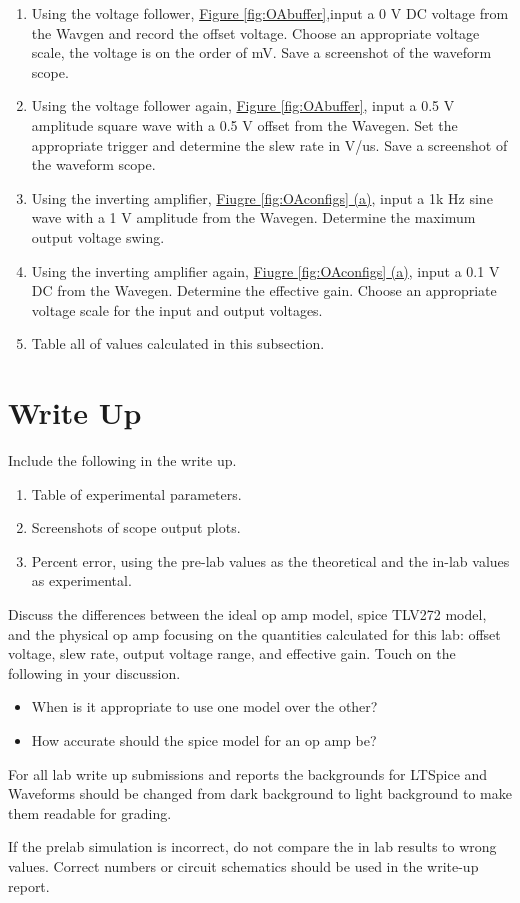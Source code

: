 \begin{enumerate}
	\item Using the voltage follower, \hyperref[fig:OAbuffer]{Figure \ref*{fig:OAbuffer}},input a 0 V DC voltage from the Wavgen and record the offset voltage. Choose an appropriate voltage scale, the voltage is on the order of mV. Save a screenshot of the waveform scope.
	\item Using the voltage follower again, \hyperref[fig:OAbuffer]{Figure \ref*{fig:OAbuffer}}, input a 0.5 V amplitude square wave with a 0.5 V offset from the Wavegen. Set the appropriate trigger and determine the slew rate in V/us. Save a screenshot of the waveform scope.
	\item Using the inverting amplifier, \hyperref[fig:OAconfigs]{Fiugre \ref*{fig:OAconfigs} (a)}, input a 1k Hz sine wave with a 1 V amplitude from the Wavegen. Determine the maximum output voltage swing. 
	\item Using the inverting amplifier again, \hyperref[fig:OAconfigs]{Fiugre \ref*{fig:OAconfigs} (a)}, input a 0.1 V DC from the Wavegen. Determine the effective gain. Choose an appropriate voltage scale for the input and output voltages. 
	\item Table all of values calculated in this subsection.
\end{enumerate}


\section{Write Up}

Include the following in the write up.

\begin{enumerate}
	\item Table of experimental parameters.
	\item Screenshots of scope output plots.
	\item Percent error, using the pre-lab values as the theoretical and the in-lab values as experimental.
\end{enumerate}

Discuss the differences between the ideal op amp model, spice TLV272 model, and the physical op amp focusing on the quantities calculated for this lab: offset voltage, slew rate, output voltage range, and effective gain. Touch on the following in your discussion.

\begin{itemize}
	\item When is it appropriate to use one model over the other?
	\item How accurate should the spice model for an op amp be?
\end{itemize}
For all lab write up submissions and reports the backgrounds for LTSpice and Waveforms should be changed from dark background to light background to make them readable for grading. 

If the prelab simulation is incorrect, do not compare the in lab results to wrong values.  Correct numbers or circuit schematics should be used in the write-up report.
